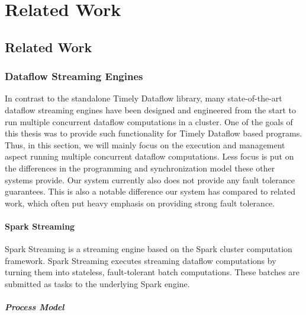 \chapter{Related Work} \label{ch:related}

\section{Related Work}

\subsection{Dataflow Streaming Engines}

In contrast to the standalone Timely Dataflow library, many state-of-the-art
dataflow streaming engines have been designed and engineered from the start
to run multiple concurrent dataflow computations in a cluster. One of the
goals of this thesis was to provide such functionality for Timely Dataflow
based programs. Thus, in this section, we will mainly focus on the execution
and management aspect running multiple concurrent dataflow computations. Less focus is
put on the differences in the programming and synchronization model these 
other systems provide. Our system currently also does not provide any fault
tolerance guarantees. This is also a notable difference our system has compared
to related work, which often put heavy emphasis on providing strong fault
tolerance.

\subsubsection{Spark Streaming}

Spark Streaming \cite{sparkstreaming} is a streaming engine based on the Spark
cluster computation framework. Spark Streaming executes streaming dataflow
computations by turning them into stateless, fault-tolerant batch computations.
These batches are submitted as tasks to the underlying Spark engine. \cite{spark} 

\paragraph{Process Model}

